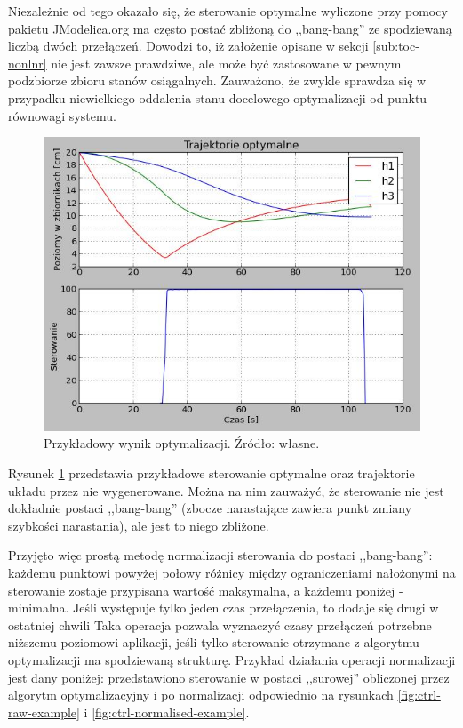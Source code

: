 Niezależnie od tego okazało się, że sterowanie optymalne wyliczone przy pomocy pakietu JModelica.org ma często postać zbliżoną do ,,bang-bang'' ze spodziewaną liczbą dwóch przełączeń. Dowodzi to, iż założenie opisane w sekcji \ref{sub:toc-nonlnr} nie jest zawsze prawdziwe, ale może być zastosowane w pewnym podzbiorze zbioru stanów osiągalnych. Zauważono, że zwykle sprawdza się w przypadku niewielkiego oddalenia stanu docelowego optymalizacji od punktu równowagi systemu.

\begin{figure}[ht]
    \centering
    \includegraphics{Grafika/optimisation_example}
    \caption{Przykładowy wynik optymalizacji. Źródło: własne.}
    \label{fig:optimisationexample}
\end{figure}

Rysunek \ref{fig:optimisationexample} przedstawia przykładowe sterowanie optymalne oraz trajektorie układu przez nie wygenerowane. Można na nim zauważyć, że sterowanie nie jest dokładnie postaci ,,bang-bang'' (zbocze narastające zawiera punkt zmiany szybkości narastania), ale jest to niego zbliżone.

Przyjęto więc prostą metodę normalizacji sterowania do postaci ,,bang-bang'': każdemu punktowi powyżej połowy różnicy między ograniczeniami nałożonymi na sterowanie zostaje przypisana wartość maksymalna, a każdemu poniżej - minimalna. Jeśli występuje tylko jeden czas przełączenia, to dodaje się drugi w ostatniej chwili
Taka operacja pozwala wyznaczyć czasy przełączeń potrzebne niższemu poziomowi aplikacji, jeśli tylko sterowanie otrzymane z algorytmu optymalizacji ma spodziewaną strukturę. Przykład działania operacji normalizacji jest dany poniżej: przedstawiono sterowanie w postaci ,,surowej'' obliczonej przez algorytm optymalizacyjny i po normalizacji odpowiednio na rysunkach \ref{fig:ctrl-raw-example} i \ref{fig:ctrl-normalised-example}.

